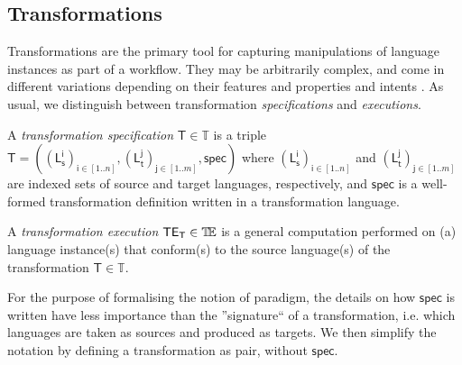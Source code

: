 \subsection{Transformations}
\label{sec:Formalisation-Transformation}

Transformations are the primary tool for capturing manipulations of language 
instances as part of a workflow. They may be arbitrarily complex, and come in 
different variations depending on their features \cite{J:Mens-VonGorp:2006} and 
properties and intents \cite{J:Lucio-Amrani-etAl:2014}. As usual, we 
distinguish between transformation \emph{specifications} and \emph{executions}.

\begin{Definition}
   A \emph{transformation specification} $\mathsf{T}\in\mathbb{T}$ is a triple 
$\mathsf{T} = ((\mathsf{L_s^{i}})_{\mathsf{i}\in [1..n]}, 
(\mathsf{L_t^{j}})_{\mathsf{j}\in[1..m]}, \mathsf{spec})$ where  
$(\mathsf{L_s^{i}})_{\mathsf{i}\in [1..n]}$ and
$(\mathsf{L_t^{j}})_{\mathsf{j}\in [1..m]}$ are indexed sets of source and
target languages, respectively, and $\mathsf{spec}$ is a well-formed 
transformation definition written in a transformation language.

   A \emph{transformation execution} $\mathsf{TE_{T}}\in\mathbb{T}\!\mathbb{E}$ is a general 
computation performed on (a) language instance(s) that conform(s) to the source 
language(s) of the transformation $\mathsf{T}\in\mathbb{T}$.
\end{Definition}
For the purpose of formalising the notion of paradigm, the details on how 
$\mathsf{spec}$ is written have less importance than the ''signature`` of 
a transformation, i.e. which languages are taken as sources and produced as 
targets. We then simplify the notation by defining a transformation as pair, 
without $\mathsf{spec}$.




